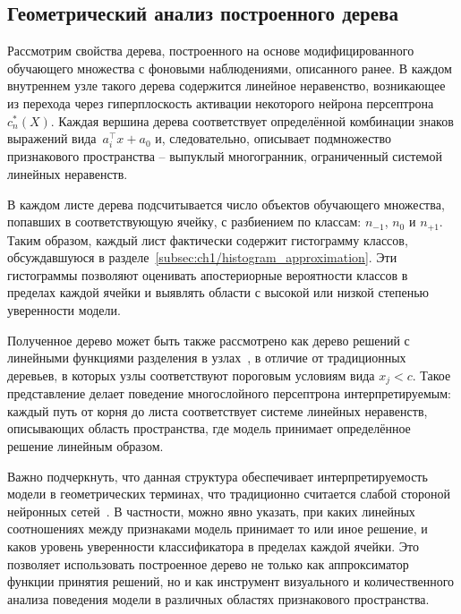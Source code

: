 \subsection{Геометрический анализ построенного дерева}

Рассмотрим свойства дерева, построенного на основе модифицированного обучающего множества с фоновыми наблюдениями, описанного ранее. В каждом внутреннем узле такого дерева содержится линейное неравенство, возникающее из перехода через гиперплоскость активации некоторого нейрона персептрона \(c_n^*(X)\). Каждая вершина дерева соответствует определённой комбинации знаков выражений вида~\(a_i^\top x + a_0\) и, следовательно, описывает подмножество признакового пространства -- выпуклый многогранник, ограниченный системой линейных неравенств.

В каждом листе дерева подсчитывается число объектов обучающего множества, попавших в соответствующую ячейку, с разбиением по классам: \(n_{-1}\), \(n_0\) и \(n_{+1}\). Таким образом, каждый лист фактически содержит гистограмму классов, обсуждавшуюся в разделе~\cref{subsec:ch1/histogram_approximation}. Эти гистограммы позволяют оценивать апостериорные вероятности классов в пределах каждой ячейки и выявлять области с высокой или низкой степенью уверенности модели.

Полученное дерево может быть также рассмотрено как дерево решений с линейными функциями разделения в узлах~\cite{devyatkinpostroenie}, в отличие от традиционных деревьев, в которых узлы соответствуют пороговым условиям вида \(x_j < c\). Такое представление делает поведение многослойного персептрона интерпретируемым: каждый путь от корня до листа соответствует системе линейных неравенств, описывающих область пространства, где модель принимает определённое решение линейным образом.

Важно подчеркнуть, что данная структура обеспечивает интерпретируемость модели в геометрических терминах, что традиционно считается слабой стороной нейронных сетей~\cite{salih2024linear}. В частности, можно явно указать, при каких линейных соотношениях между признаками модель принимает то или иное решение, и каков уровень уверенности классификатора в пределах каждой ячейки. Это позволяет использовать построенное дерево не только как аппроксиматор функции принятия решений, но и как инструмент визуального и количественного анализа поведения модели в различных областях признакового пространства.

